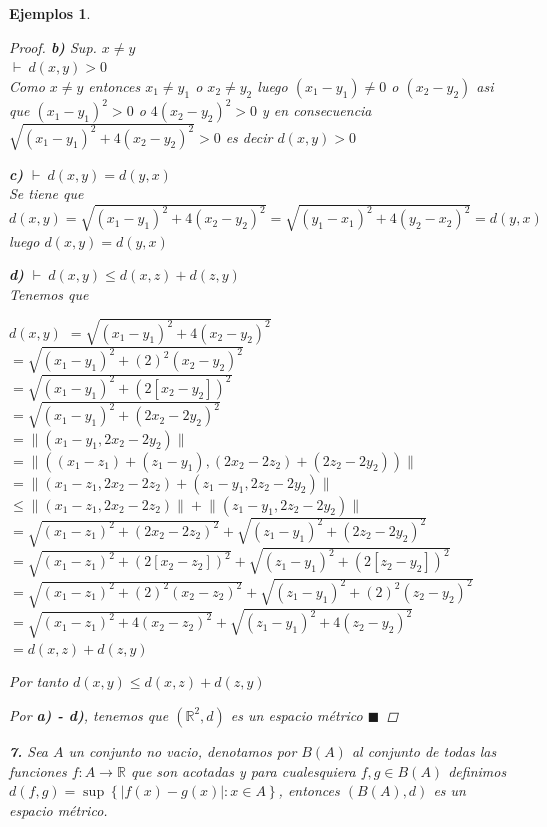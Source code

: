\documentclass[oneside]{book} %
\theoremstyle{Teorema}
\theoremstyle{Ejemplos}
\newtheorem{Ejemplos}[Definicion]{Ejemplos}
\theoremstyle{[Obs]}
\newcommand{\abs}[1]{\left|#1\right|} %
\newcommand{\norm}[1]{\lVert#1\rVert} %
\renewcommand{\{}{\left\lbrace} %
\renewcommand{\}}{\right\rbrace} %
\newcommand{\R}{\mathbb{R}} %
\newcommand{\Ri}[1]{\mathbb{R}^{#1}} %
\renewcommand{\qed}{$\blacksquare$} %
\newcommand{\pd}{$\vdash\ $} %
\begin{document}
\begin{Ejemplos}
\begin{proof}
					\textbf{b)} Sup. $x \neq y$ \\
					\pd $d(x, y) > 0$ \\
					Como $x \neq y$ entonces $x_1 \neq y_1$ o $x_2 \neq y_2$ luego $(x_1 - y_1) \neq 0$ o $(x_2 - y_2)$ asi que $(x_1 - y_1)^2 > 0$ o $4(x_2 - y_2)^2 > 0$ y en consecuencia $\sqrt{(x_1 - y_1)^2 + 4(x_2 - y_2)^2} > 0$ es decir $d(x, y) > 0$ 

					\textbf{c)} \pd $d(x, y) = d(y, x)$ \\
					Se tiene que $d(x, y) = \sqrt{(x_1 - y_1)^2 + 4(x_2 - y_2)^2} = \sqrt{(y_1 - x_1)^2 + 4(y_2 - x_2)^2} = d(y, x)$ luego $d(x, y) = d(y, x)$ 

					\textbf{d)} \pd $d(x, y) \leq d(x, z) + d(z, y)$ \\
					Tenemos que
					
					$d(x, y)$ 
					$= \sqrt{(x_1 - y_1)^2 + 4(x_2 - y_2)^2}$ \\
					$= \sqrt{(x_1 - y_1)^2 + (2)^2(x_2 - y_2)^2}$ \\
					$= \sqrt{(x_1 - y_1)^2 + (2[x_2 - y_2])^2}$ \\
					$= \sqrt{(x_1 - y_1)^2 + (2x_2 - 2y_2)^2}$ \\
					$= \norm{(x_1 - y_1, 2x_2 - 2y_2)}$ \\
					$= \norm{((x_1 - z_1) + (z_1 - y_1), (2x_2 -2z_2) + (2z_2 - 2y_2))}$ \\
					$= \norm{(x_1 - z_1, 2x_2 - 2z_2) + (z_1 - y_1, 2z_2 - 2y_2)}$ \\
					$\leq \norm{(x_1 - z_1, 2x_2 - 2z_2)} + \norm{(z_1 - y_1, 2z_2 - 2y_2)}$ \\
					$= \sqrt{(x_1 - z_1)^2 + (2x_2 - 2z_2)^2} + \sqrt{(z_1 - y_1)^2 + (2z_2 - 2y_2)^2}$ \\
					$= \sqrt{(x_1 - z_1)^2 + (2[x_2 - z_2])^2} + \sqrt{(z_1 - y_1)^2 + (2[z_2 - y_2])^2}$ \\
					$= \sqrt{(x_1 - z_1)^2 + (2)^2(x_2 - z_2)^2} + \sqrt{(z_1 - y_1)^2 + (2)^2(z_2 - y_2)^2}$ \\
					$= \sqrt{(x_1 - z_1)^2 + 4(x_2 - z_2)^2} + \sqrt{(z_1 - y_1)^2 + 4(z_2 - y_2)^2}$ \\
					$= d(x, z) + d(z, y)$
					
					Por tanto $d(x, y) \leq d(x, z) + d(z, y)$

					Por \textbf{a) - d)}, tenemos que $(\Ri{2}, d)$ es un espacio métrico \qed 

				\end{proof}

				\textbf{7.} Sea $A$ un conjunto no vacio, denotamos por $B(A)$ al conjunto de todas las funciones $f : A \to \R$ que son acotadas y para cualesquiera $f, g \in B(A)$ definimos $d(f, g) = \sup\{ \abs{f(x) - g(x)} : x \in A \}$, entonces $(B(A), d)$ es un espacio métrico. 


\end{Ejemplos}
\end{document}
